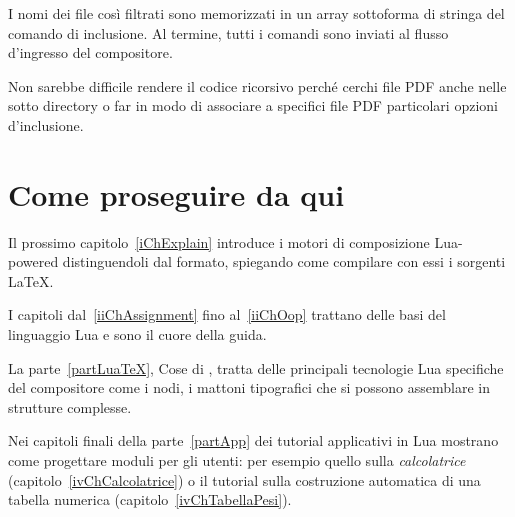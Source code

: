 I nomi dei file così filtrati sono memorizzati in un array sottoforma di stringa
del comando di inclusione. Al termine, tutti i comandi  sono
inviati al flusso d'ingresso del compositore.

Non sarebbe difficile rendere il codice ricorsivo perché cerchi file PDF anche
nelle sotto directory o far in modo di associare a specifici file PDF
particolari opzioni d'inclusione.


\section{Come proseguire da qui}

Il prossimo capitolo~\ref{iChExplain} introduce i motori di composizione
Lua-powered distinguendoli dal formato, spiegando come compilare con essi i
sorgenti \LaTeX{}.

I capitoli dal~\ref{iiChAssignment} fino al~\ref{iiChOop} trattano delle basi
del linguaggio Lua e sono il cuore della guida.

La parte~\ref{partLuaTeX}, Cose di \LuaTeX, tratta delle principali tecnologie
Lua specifiche del compositore come i nodi, i mattoni tipografici che si possono
assemblare in strutture complesse.

Nei capitoli finali della parte~\ref{partApp} dei tutorial applicativi in Lua
mostrano come progettare moduli per gli utenti: per esempio quello sulla
\emph{calcolatrice} (capitolo~\ref{ivChCalcolatrice}) o il tutorial sulla
costruzione automatica di una tabella numerica (capitolo~\ref{ivChTabellaPesi}).

